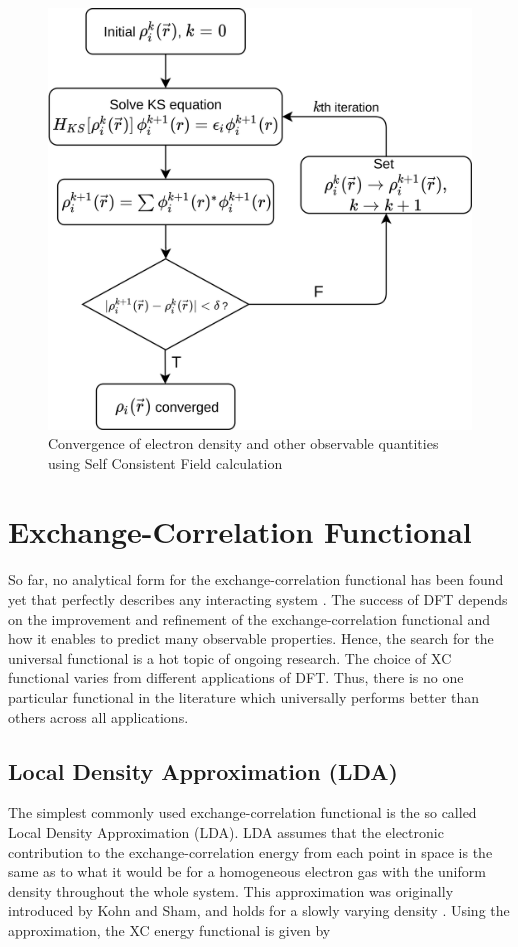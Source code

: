 \begin{figure}[tbh!]
	\centering
	\includegraphics[width=0.7\linewidth]{"images/theory/scf_loop"}
	\caption[Self consistent field diagram]{Convergence of electron density and other observable quantities using Self Consistent Field calculation}
	\label{fig:scf_loop}
\end{figure}
\section{Exchange-Correlation Functional}
So far, no analytical form for the exchange-correlation functional has been found yet that perfectly describes any interacting system \citep{Verma2020,Marques2012,Segala2009}. The success of DFT depends on the improvement and refinement of the exchange-correlation functional and how it enables to predict many observable properties. Hence, the search for the universal functional is a hot topic of ongoing research. The choice of XC functional varies from different applications of DFT. Thus, there is no one particular functional in the literature which universally performs better than others across all applications.

\subsection{Local Density Approximation (LDA)}
The simplest commonly used exchange-correlation functional is the so called Local Density Approximation (LDA).  LDA assumes that the electronic contribution to the exchange-correlation energy from each point in space is the same as to what it would be for a homogeneous electron gas with the uniform density throughout the whole system. This approximation was originally introduced by Kohn and Sham, and holds for a slowly varying density \citep{Kohn1965}. Using the approximation, the XC energy functional is given by

